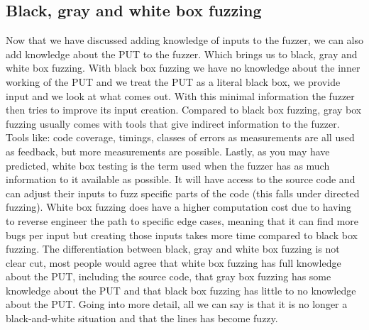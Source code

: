 \subsection{Black, gray and white box fuzzing}
\label{fuzzing:BlackGrayWhiteFuzzing}
Now that we have discussed adding knowledge of inputs to the fuzzer, we can also add knowledge about the PUT to the fuzzer. Which brings us to black, gray and white box fuzzing. With black box fuzzing we have no knowledge about the inner working of the PUT and we treat the PUT as a literal black box, we provide input and we look at what comes out. With this minimal information the fuzzer then tries to improve its input creation. Compared to black box fuzzing, gray box fuzzing usually comes with tools that give indirect information to the fuzzer. Tools like: code coverage, timings, classes of errors as measurements are all used as feedback, but more measurements are possible. Lastly, as you may have predicted, white box testing is the term used when the fuzzer has as much information to it available as possible. It will have access to the source code and can adjust their inputs to fuzz specific parts of the code (this falls under directed fuzzing). White box fuzzing does have a higher computation cost due to having to reverse engineer the path to specific edge cases, meaning that it can find more bugs per input but creating those inputs takes more time compared to black box fuzzing. The differentiation between black, gray and white box fuzzing is not clear cut, most people would agree that white box fuzzing has full knowledge about the PUT, including the source code, that gray box fuzzing has some knowledge about the PUT and that black box fuzzing has little to no knowledge about the PUT. Going into more detail, all we can say is that it is no longer a black-and-white situation and that the lines has become fuzzy.

